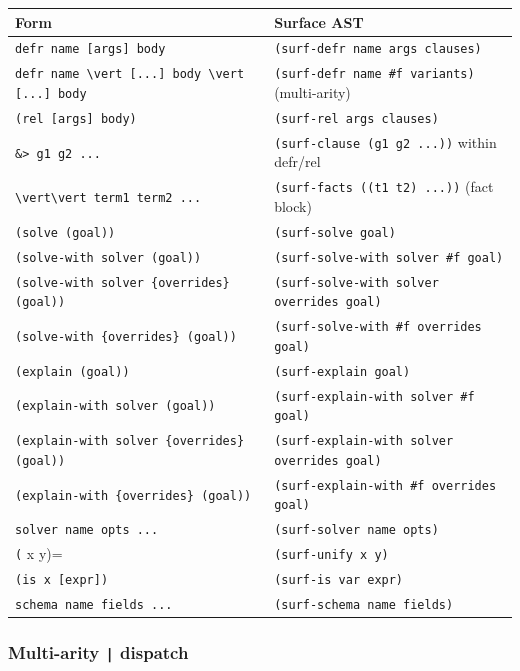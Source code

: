 \documentclass[11pt]{article}
\begin{document}
\begin{center}
\begin{tabular}{ll}
Form & Surface AST\\
\hline
\texttt{defr name [args] body} & \texttt{(surf-defr name args clauses)}\\
\texttt{defr name \textbackslash{}vert [...] body \textbackslash{}vert [...] body} & \texttt{(surf-defr name \#f variants)} (multi-arity)\\
\texttt{(rel [args] body)} & \texttt{(surf-rel args clauses)}\\
\texttt{\&> g1 g2 ...} & \texttt{(surf-clause (g1 g2 ...))} within defr/rel\\
\texttt{\textbackslash{}vert\textbackslash{}vert term1 term2 ...} & \texttt{(surf-facts ((t1 t2) ...))} (fact block)\\
\texttt{(solve (goal))} & \texttt{(surf-solve goal)}\\
\texttt{(solve-with solver (goal))} & \texttt{(surf-solve-with solver \#f goal)}\\
\texttt{(solve-with solver \{overrides\} (goal))} & \texttt{(surf-solve-with solver overrides goal)}\\
\texttt{(solve-with \{overrides\} (goal))} & \texttt{(surf-solve-with \#f overrides goal)}\\
\texttt{(explain (goal))} & \texttt{(surf-explain goal)}\\
\texttt{(explain-with solver (goal))} & \texttt{(surf-explain-with solver \#f goal)}\\
\texttt{(explain-with solver \{overrides\} (goal))} & \texttt{(surf-explain-with solver overrides goal)}\\
\texttt{(explain-with \{overrides\} (goal))} & \texttt{(surf-explain-with \#f overrides goal)}\\
\texttt{solver name opts ...} & \texttt{(surf-solver name opts)}\\
\texttt{(} x y)= & \texttt{(surf-unify x y)}\\
\texttt{(is x [expr])} & \texttt{(surf-is var expr)}\\
\texttt{schema name fields ...} & \texttt{(surf-schema name fields)}\\
\end{tabular}
\end{center}
\subsubsection{Multi-arity \texttt{|} dispatch}
\label{sec:org5dd2e74}
\end{document}
